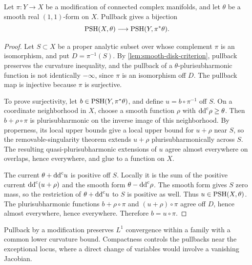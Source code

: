\begin{proposition}\label{prop:psh-descent-modification}
Let $\pi\colon Y\to X$ be a modification of connected complex manifolds, and let $\theta$ be a smooth real $(1,1)$-form on $X$. Pullback gives a bijection
\[
 \mathrm{PSH}(X,\theta)\longrightarrow\mathrm{PSH}(Y,\pi^*\theta).
\]
\end{proposition}
\begin{proof}
Let $S\subset X$ be a proper analytic subset over whose complement $\pi$ is an isomorphism, and put $D=\pi^{-1}(S)$. By \cref{lem:smooth-disk-criterion}, pullback preserves the curvature inequality, and the pullback of a $\theta$-plurisubharmonic function is not identically $-\infty$, since $\pi$ is an isomorphism off $D$. The pullback map is injective because $\pi$ is surjective.

To prove surjectivity, let $b\in\mathrm{PSH}(Y,\pi^*\theta)$, and define $u=b\circ\pi^{-1}$ off $S$. On a coordinate neighborhood in $X$, choose a smooth function $\rho$ with $\mathrm{dd}^{\mathrm{c}}\rho\geq\theta$. Then $b+\rho\circ\pi$ is plurisubharmonic on the inverse image of this neighborhood. By properness, its local upper bounds give a local upper bound for $u+\rho$ near $S$, so the removable-singularity theorem extends $u+\rho$ plurisubharmonically across $S$. The resulting quasi-plurisubharmonic extensions of $u$ agree almost everywhere on overlaps, hence everywhere, and glue to a function on $X$.

The current $\theta+\mathrm{dd}^{\mathrm{c}} u$ is positive off $S$. Locally it is the sum of the positive current $\mathrm{dd}^{\mathrm{c}}(u+\rho)$ and the smooth form $\theta-\mathrm{dd}^{\mathrm{c}}\rho$. The smooth form gives $S$ zero mass, so the restriction of $\theta+\mathrm{dd}^{\mathrm{c}} u$ to $S$ is positive as well. Thus $u\in\mathrm{PSH}(X,\theta)$. The plurisubharmonic functions $b+\rho\circ\pi$ and $(u+\rho)\circ\pi$ agree off $D$, hence almost everywhere, hence everywhere. Therefore $b=u\circ\pi$.
\end{proof}

Pullback by a modification preserves $L^1$ convergence within a family with a common lower curvature bound. Compactness controls the pullbacks near the exceptional locus, where a direct change of variables would involve a vanishing Jacobian.

